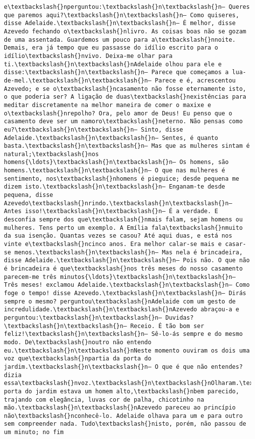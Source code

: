 \begin{Verbatim}[commandchars=\\\{\}]
e\textbackslash{}nperguntou:\textbackslash{}n\textbackslash{}n— Queres que paremos aqui?\textbackslash{}n\textbackslash{}n— Como quiseres, disse Adelaide.\textbackslash{}n\textbackslash{}n— É melhor, disse Azevedo fechando o\textbackslash{}nlivro. As coisas boas não se gozam de uma assentada. Guardemos um pouco para a\textbackslash{}nnoite. Demais, era já tempo que eu passasse do idílio escrito para o idílio\textbackslash{}nvivo. Deixa-me olhar para ti.\textbackslash{}n\textbackslash{}nAdelaide olhou para ele e disse:\textbackslash{}n\textbackslash{}n— Parece que começamos a lua-de-mel.\textbackslash{}n\textbackslash{}n— Parece e é, acrescentou Azevedo; e se o\textbackslash{}ncasamento não fosse eternamente isto, o que poderia ser? A ligação de duas\textbackslash{}nexistências para meditar discretamente na melhor maneira de comer o maxixe e o\textbackslash{}nrepolho? Ora, pelo amor de Deus! Eu penso que o casamento deve ser um namoro\textbackslash{}neterno. Não pensas como eu?\textbackslash{}n\textbackslash{}n— Sinto, disse Adelaide.\textbackslash{}n\textbackslash{}n— Sentes, é quanto basta.\textbackslash{}n\textbackslash{}n— Mas que as mulheres sintam é natural;\textbackslash{}nos homens{\ldots}\textbackslash{}n\textbackslash{}n— Os homens, são homens.\textbackslash{}n\textbackslash{}n— O que nas mulheres é sentimento, nos\textbackslash{}nhomens é pieguice; desde pequena me dizem isto.\textbackslash{}n\textbackslash{}n— Enganam-te desde pequena, disse Azevedo\textbackslash{}nrindo.\textbackslash{}n\textbackslash{}n— Antes isso!\textbackslash{}n\textbackslash{}n— É a verdade. E desconfia sempre dos que\textbackslash{}nmais falam, sejam homens ou mulheres. Tens perto um exemplo. A Emília fala\textbackslash{}nmuito da sua isenção. Quantas vezes se casou? Até aqui duas, e está nos vinte e\textbackslash{}ncinco anos. Era melhor calar-se mais e casar-se menos.\textbackslash{}n\textbackslash{}n— Mas nela é brincadeira, disse Adelaide.\textbackslash{}n\textbackslash{}n— Pois não. O que não é brincadeira é que\textbackslash{}nos três meses do nosso casamento parecem-me três minutos{\ldots}\textbackslash{}n\textbackslash{}n— Três meses! exclamou Adelaide.\textbackslash{}n\textbackslash{}n— Como foge o tempo! disse Azevedo.\textbackslash{}n\textbackslash{}n— Dirás sempre o mesmo? perguntou\textbackslash{}nAdelaide com um gesto de incredulidade.\textbackslash{}n\textbackslash{}nAzevedo abraçou-a e perguntou:\textbackslash{}n\textbackslash{}n— Duvidas?\textbackslash{}n\textbackslash{}n— Receio. É tão bom ser feliz!\textbackslash{}n\textbackslash{}n— Sê-lo-ás sempre e do mesmo modo. De\textbackslash{}noutro não entendo eu.\textbackslash{}n\textbackslash{}nNeste momento ouviram os dois uma voz que\textbackslash{}npartia da porta do jardim.\textbackslash{}n\textbackslash{}n— O que é que não entendes? dizia essa\textbackslash{}nvoz.\textbackslash{}n\textbackslash{}nOlharam.\textbackslash{}n\textbackslash{}nÀ porta do jardim estava um homem alto,\textbackslash{}nbem parecido, trajando com elegância, luvas cor de palha, chicotinho na mão.\textbackslash{}n\textbackslash{}nAzevedo pareceu ao princípio não\textbackslash{}nconhecê-lo. Adelaide olhava para um e para outro sem compreender nada. Tudo\textbackslash{}nisto, porém, não passou de um minuto; no fim 
\end{Verbatim}
